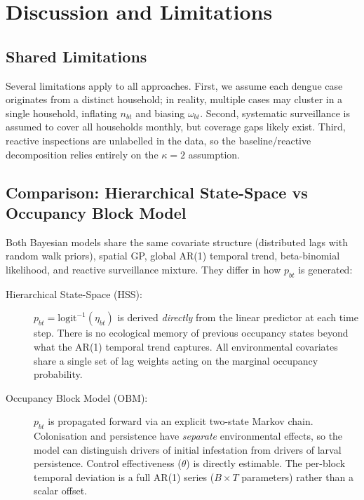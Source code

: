\documentclass[12pt,a4paper]{article}
\begin{document}
\section{Discussion and Limitations}

\subsection{Shared Limitations}

Several limitations apply to all approaches. First, we assume each dengue case originates from a distinct household; in reality, multiple cases may cluster in a single household, inflating $n_{bt}$ and biasing $\omega_{bt}$. Second, systematic surveillance is assumed to cover all households monthly, but coverage gaps likely exist. Third, reactive inspections are unlabelled in the data, so the baseline/reactive decomposition relies entirely on the $\kappa = 2$ assumption.

\subsection{Comparison: Hierarchical State-Space vs Occupancy Block Model}

Both Bayesian models share the same covariate structure (distributed lags with random walk priors), spatial GP, global AR(1) temporal trend, beta-binomial likelihood, and reactive surveillance mixture. They differ in how $p_{bt}$ is generated:

\begin{description}
  \item[Hierarchical State-Space (HSS):] $p_{bt} = \text{logit}^{-1}(\eta_{bt})$ is derived \emph{directly} from the linear predictor at each time step. There is no ecological memory of previous occupancy states beyond what the AR(1) temporal trend captures. All environmental covariates share a single set of lag weights acting on the marginal occupancy probability.
  \item[Occupancy Block Model (OBM):] $p_{bt}$ is propagated forward via an explicit two-state Markov chain. Colonisation and persistence have \emph{separate} environmental effects, so the model can distinguish drivers of initial infestation from drivers of larval persistence. Control effectiveness ($\theta$) is directly estimable. The per-block temporal deviation is a full AR(1) series ($B \times T$ parameters) rather than a scalar offset.
\end{description}
\end{document}
